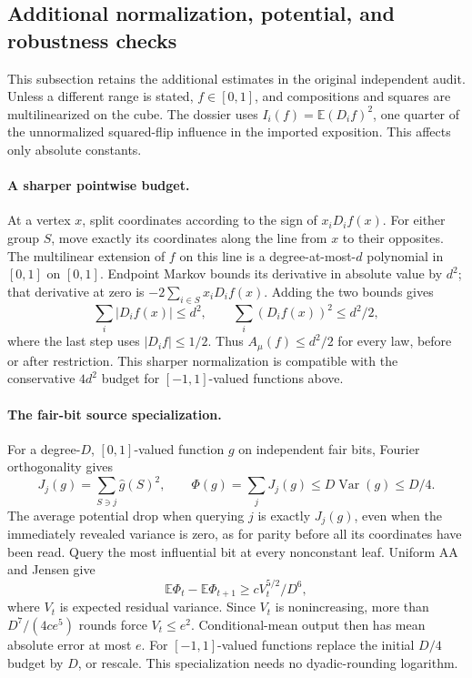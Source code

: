 \subsection{Additional normalization, potential, and robustness checks}
\label{influence-recovery:audit-supplements}

This subsection retains the additional estimates in the original
independent audit. Unless a different range is stated, \(f\in[0,1]\),
and compositions and squares are multilinearized on the cube.
The dossier uses \(I_i(f)=\mathbb E(D_i f)^2\), one quarter of the
unnormalized squared-flip influence in the imported exposition.
This affects only absolute constants.

\paragraph{A sharper pointwise budget.}
At a vertex \(x\), split coordinates according to the sign of
\(x_iD_i f(x)\). For either group \(S\), move exactly its coordinates
along the line from \(x\) to their opposites. The multilinear extension
of \(f\) on this line is a degree-at-most-\(d\) polynomial in \([0,1]\)
on \([0,1]\). Endpoint Markov bounds its derivative in absolute value
by \(d^2\); that derivative at zero is
\(-2\sum_{i\in S}x_iD_i f(x)\). Adding the two bounds gives
\[
 \sum_i|D_i f(x)|\le d^2,
 \qquad
 \sum_i(D_i f(x))^2\le d^2/2,
\]
where the last step uses \(|D_i f|\le1/2\). Thus
\(A_\mu(f)\le d^2/2\) for every law, before or after restriction.
This sharper normalization is compatible with the conservative
\(4d^2\) budget for \([-1,1]\)-valued functions above.

\paragraph{The fair-bit source specialization.}
For a degree-\(D\), \([0,1]\)-valued function \(g\) on independent fair
bits, Fourier orthogonality gives
\[
 J_j(g)=\sum_{S\ni j}\widehat g(S)^2,
 \qquad
 \Phi(g)=\sum_jJ_j(g)\le D\operatorname{Var}(g)\le D/4.
\]
The average potential drop when querying \(j\) is exactly \(J_j(g)\),
even when the immediately revealed variance is zero, as for parity
before all its coordinates have been read. Query the most influential
bit at every nonconstant leaf. Uniform AA and Jensen give
\[
 \mathbb E\Phi_t-\mathbb E\Phi_{t+1}
 \ge cV_t^{5/2}/D^6,
\]
where \(V_t\) is expected residual variance. Since \(V_t\) is
nonincreasing, more than \(D^7/(4ce^5)\) rounds force \(V_t\le e^2\).
Conditional-mean output then has mean absolute error at most \(e\).
For \([-1,1]\)-valued functions replace the initial \(D/4\) budget by
\(D\), or rescale. This specialization needs no dyadic-rounding logarithm.

